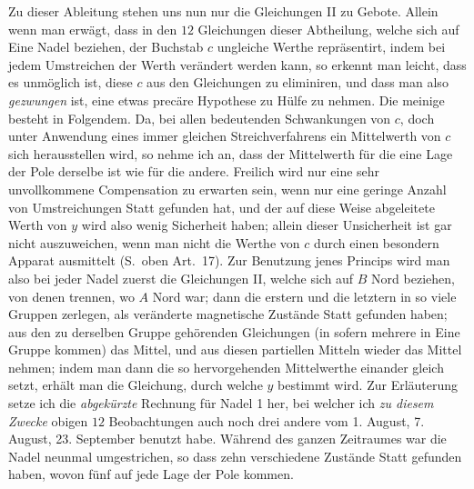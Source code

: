 Zu dieser Ableitung stehen uns nun nur die Gleichungen II zu Gebote. Allein wenn man erwägt, dass in den $12$ Gleichungen dieser Abtheilung, welche sich auf Eine Nadel beziehen, der Buchstab $c$ ungleiche Werthe repräsentirt, indem bei jedem Umstreichen der Werth verändert werden kann, so erkennt man leicht, dass es unmöglich ist, diese $c$ aus den Gleichungen zu eliminiren, und dass man also \textit{gezwungen} ist, eine etwas precäre Hypothese zu Hülfe zu nehmen. Die meinige besteht in Folgendem. Da, bei allen bedeutenden Schwankungen von $c$, doch unter Anwendung eines immer gleichen Streichverfahrens ein Mittelwerth von $c$ sich herausstellen wird, so nehme ich an, dass der Mittelwerth für die eine Lage der Pole derselbe ist wie für die andere. Freilich wird nur eine sehr unvollkommene Compensation zu erwarten sein, wenn nur eine geringe Anzahl von Umstreichungen Statt gefunden hat, und der auf diese Weise abgeleitete Werth von $y$ wird also wenig Sicherheit haben; allein dieser Unsicherheit ist gar nicht auszuweichen, wenn man nicht die Werthe von $c$ durch einen besondern Apparat ausmittelt (S.\ oben Art.\ 17). Zur Benutzung jenes Princips wird man also bei jeder Nadel zuerst die Gleichungen II, welche sich auf $B$ Nord beziehen, von denen trennen, wo $A$ Nord war; dann die erstern und die letztern in so viele Gruppen zerlegen, als veränderte magnetische Zustände Statt gefunden haben; aus den zu derselben Gruppe gehörenden Gleichungen (in sofern mehrere in Eine Gruppe kommen) das Mittel, und aus diesen partiellen Mitteln wieder das Mittel nehmen; indem man dann die so hervorgehenden Mittelwerthe einander gleich setzt, erhält man die Gleichung, durch welche $y$ bestimmt wird. Zur Erläuterung setze ich die \textit{abgekürzte} Rechnung für Nadel 1 her, bei welcher ich \textit{zu diesem Zwecke} obigen $12$ Beobachtungen auch noch drei andere vom 1. August, 7. August, 23. September benutzt habe. Während des ganzen Zeitraumes war die Nadel neunmal umgestrichen, so dass zehn verschiedene Zustände Statt gefunden haben, wovon fünf auf jede Lage der Pole kommen.

